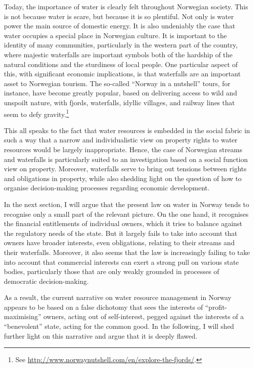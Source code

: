 Today, the importance of water is clearly felt throughout Norwegian society. This is not because water is scare, but because it is so plentiful. Not only is water power the main source of domestic energy.  It is also undeniably the case that water occupies a special place in Norwegian culture. It is important to the identity of many communities, particularly in the western part of the country, where majestic waterfalls are important symbols both of the hardship of the natural conditions and the sturdiness of local people. One particular aspect of this, with significant economic implications, is that waterfalls are an important asset to Norwegian tourism. The so-called ``Norway in a nutshell'' tours, for instance, have become greatly popular, based on delivering access to wild and unspoilt nature, with fjords, waterfalls, idyllic villages, and railway lines that seem to defy gravity.\footnote{See \url{http://www.norwaynutshell.com/en/explore-the-fjords/}.}

This all speaks to the fact that water resources is embedded in the social fabric in such a way that a narrow and individualistic view on property rights to water resources would be largely inappropriate. Hence, the case of Norwegian streams and waterfalls is particularly suited to an investigation based on a social function view on property. Moreover, waterfalls serve to bring out tensions between rights and obligations in property, while also shedding light on the question of how to organise decision-making processes regarding economic development.

In the next section, I will argue that the present law on water in Norway tends to recognise only a small part of the relevant picture. On the one hand, it recognises the financial entitlements of individual owners, which it tries to balance against the regulatory needs of the state. But it largely fails to take into account that owners have broader interests, even obligations, relating to their streams and their waterfalls. Moreover, it also seems that the law is increasingly failing to take into account that commercial interests can exert a strong pull on various state bodies, particularly those that are only weakly grounded in processes of democratic decision-making.

As a result, the current narrative on water resource management in Norway appears to be based on a false dichotomy that sees the interests of ``profit-maximising'' owners, acting out of self-interest, pegged against the interests of a ``benevolent'' state, acting for the common good. In the following, I will shed further light on this narrative and argue that it is deeply flawed.

